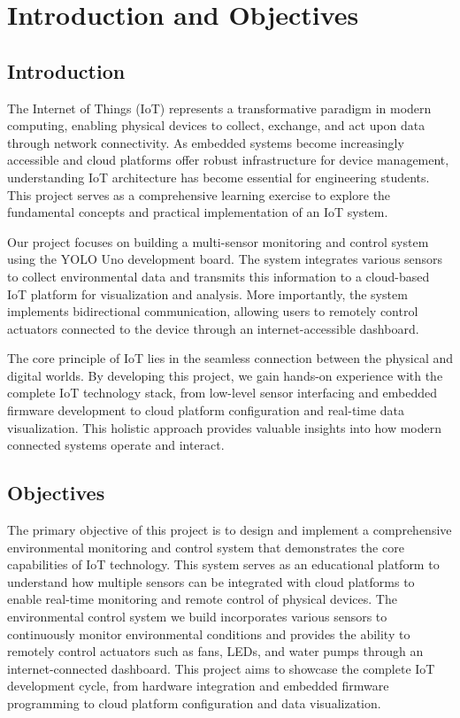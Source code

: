 \chapter*{Introduction and Objectives}

\section*{Introduction}

The Internet of Things (IoT) represents a transformative paradigm in modern computing, enabling physical devices to collect, exchange, and act upon data through network connectivity. As embedded systems become increasingly accessible and cloud platforms offer robust infrastructure for device management, understanding IoT architecture has become essential for engineering students. This project serves as a comprehensive learning exercise to explore the fundamental concepts and practical implementation of an IoT system.

Our project focuses on building a multi-sensor monitoring and control system using the YOLO Uno development board. The system integrates various sensors to collect environmental data and transmits this information to a cloud-based IoT platform for visualization and analysis. More importantly, the system implements bidirectional communication, allowing users to remotely control actuators connected to the device through an internet-accessible dashboard.

The core principle of IoT lies in the seamless connection between the physical and digital worlds. By developing this project, we gain hands-on experience with the complete IoT technology stack, from low-level sensor interfacing and embedded firmware development to cloud platform configuration and real-time data visualization. This holistic approach provides valuable insights into how modern connected systems operate and interact.

\section*{Objectives}

The primary objective of this project is to design and implement a comprehensive environmental monitoring and control system that demonstrates the core capabilities of IoT technology. This system serves as an educational platform to understand how multiple sensors can be integrated with cloud platforms to enable real-time monitoring and remote control of physical devices. The environmental control system we build incorporates various sensors to continuously monitor environmental conditions and provides the ability to remotely control actuators such as fans, LEDs, and water pumps through an internet-connected dashboard. This project aims to showcase the complete IoT development cycle, from hardware integration and embedded firmware programming to cloud platform configuration and data visualization.

